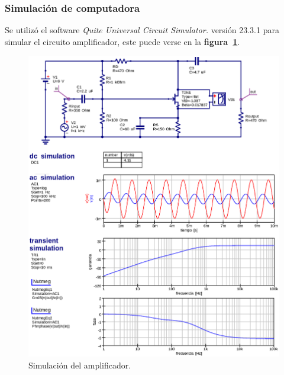 \subsubsection{Simulación de computadora}
Se utilizó el software \emph{Quite Universal Circuit Simulator.} versión 23.3.1
para simular el circuito amplificador, este puede verse en la
\textbf{figura~\ref{figura24}}.

\begin{figure}[!h]
\centering
\includegraphics[scale=0.72]{diagramas/figura24.eps}
\caption{Simulación del amplificador.}
\label{figura24}
\end{figure}

